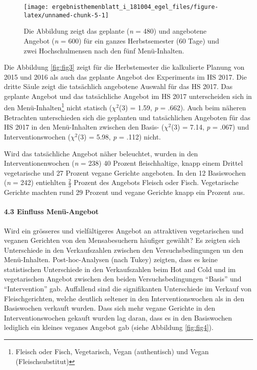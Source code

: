 \documentclass[12pt,ngerman,]{article}
\let\oldparagraph\paragraph
\renewcommand{\paragraph}[1]{\oldparagraph{#1}\mbox{}}
\let\rmarkdownfootnote\footnote%
\def\footnote{\protect\rmarkdownfootnote}
\begin{document}
\begin{figure}[H]

{\centering \texttt{[image: ergebnisthemenblatt\_i\_181004\_egel\_files/figure-latex/unnamed-chunk-5-1]} 

}

\caption{\label{fig:fig3} Die Abbildung zeigt das geplante (\textit{n} = 480) und angebotene Angebot (\textit{n} = 600) für ein ganzes Herbstsemester (60 Tage) und zwei Hochschulmensen nach den fünf Menü-Inhalten.}\label{fig:unnamed-chunk-5}
\end{figure}

Die Abbildung \ref{fig:fig3} zeigt für die Herbstemester die kalkulierte
Planung von 2015 und 2016 als auch das geplante Angebot des Experiments
im HS 2017. Die dritte Säule zeigt die tatsächlich angebotene Auswahl
für das HS 2017. Das geplante Angebot und das tatsächliche Angebot im HS
2017 unterscheiden sich in den Menü-Inhalten\footnote{Fleisch oder
  Fisch, Vegetarisch, Vegan (authentisch) und Vegan (Fleischsubstitut)}
nicht statisch (\(\chi^2\)(3) = 1.59, \emph{p} = .662). Auch beim
näheren Betrachten unterschieden sich die geplanten und tatsächlichen
Angeboten für das HS 2017 in den Menü-Inhalten zwischen den Basis-
(\(\chi^2\)(3) = 7.14, \emph{p} = .067) und Interventionswochen
(\(\chi^2\)(3) = 5.98, \emph{p} = .112) nicht.

\par

Wird das tatsächliche Angebot näher beleuchtet, wurden in den
Interventionenwochen (\emph{n} = 238) 40 Prozent fleischhaltige, knapp
einem Drittel vegetarische und 27 Prozent vegane Gerichte angeboten. In
den 12 Basiswochen (\emph{n} = 242) entiehlten \(\frac{2}{3}\) Prozent
des Angebots Fleisch oder Fisch. Vegetarische Gerichte machten rund 29
Prozent und vegane Gerichte knapp ein Prozent aus.

\hypertarget{einfluss-menu-angebot}{%
\paragraph{4.3 Einfluss Menü-Angebot}\label{einfluss-menu-angebot}}

Wird ein grösseres und vielfältigeres Angebot an attraktiven
vegetarischen und veganen Gerichten von den Mensabesuchern häufiger
gewählt? Es zeigten sich Unterschiede in den Verkaufszahlen zwischen den
Versuchsbedingungen un den Menü-Inhalten. Post-hoc-Analysen (nach Tukey)
zeigten, dass es keine statistischen Unterschiede in den Verkaufszahlen
beim Hot and Cold und im vegetarischen Angebot zwischen den beiden
Versuchsbedingungen ``Basis'' und ``Intervention'' gab. Auffallend sind
die signifikanten Unterschiede im Verkauf von Fleischgerichten, welche
deutlich seltener in den Interventionswochen als in den Basiswochen
verkauft wurden. Dass sich mehr vegane Gerichte in den
Interventionswochen gekauft wurden lag daran, dass es in den Basiswochen
lediglich ein kleines veganes Angebot gab (siehe Abbildung
\ref{fig:fig4}).
\end{document}
